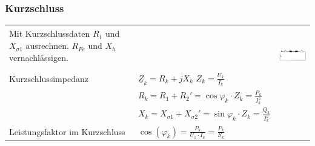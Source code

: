 		\subsubsection{Kurzschluss}
			\begin{tabular}{p{6cm}p{6cm}p{6.5cm}}
            		\begin{minipage}{12cm}
                    	Mit Kurzschlussdaten $R_1$ und $X_{\sigma1}$ ausrechnen. $R_{Fe}$ und $X_h$ vernachl\"assigen.
                    \end{minipage} 
					& &	
					\multirow{3}{6.5cm}{
	            		\includegraphics[height=2.5cm]{bilder/KurzschlussErsatzschaltbild.png} } \\
	            \\
				Kurzschlussimpedanz&
					$\underline{Z}_k = R_k + jX_k$ $Z_k = \frac{U_k}{I_k}$ \\
					& $R_k = R_1 + R_2' = \cos{\varphi_k} \cdot Z_k  = \frac{P_k}{I_k^2}$  \\
					& $X_k = X_{\sigma1} + X_{\sigma2}' = \sin{\varphi_k} \cdot Z_k = \frac{Q_k}{I_k^2}$ \\
				Leistungsfaktor im Kurzschluss&
					$\cos(\varphi_k) = \frac{P_k}{U_1 \cdot I_k} = \frac{P_k}{S_k}$ \\
             \end{tabular}


